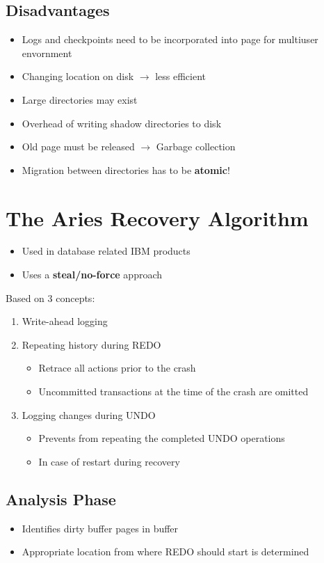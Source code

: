 \subsection{Disadvantages}
\begin{itemize}
	\item Logs and checkpoints need to be incorporated into page for multiuser envornment
	\item Changing location on disk $\rightarrow$ less efficient
	\item Large directories may exist
	\item Overhead of writing shadow directories to disk
	\item Old page must be released $\rightarrow$ Garbage collection
	\item Migration between directories has to be \textbf{atomic}!
\end{itemize}

\section{The Aries Recovery Algorithm}
\begin{itemize}
	\item Used in database related IBM products
	\item Uses a \textbf{steal/no-force} approach
\end{itemize}
Based on 3 concepts:
\begin{enumerate}
	\item Write-ahead logging
	\item Repeating history during REDO
	\begin{itemize}
		\item Retrace all actions prior to the crash
		\item Uncommitted transactions at the time of the crash are omitted
	\end{itemize}
	\item Logging changes during UNDO
	\begin{itemize}
		\item Prevents from repeating  the completed UNDO operations
		\item In case of restart during recovery
	\end{itemize}
\end{enumerate}

\subsection{Analysis Phase}
\begin{itemize}
	\item Identifies dirty buffer pages in buffer
	\item Appropriate location from where REDO should start is determined
\end{itemize}

